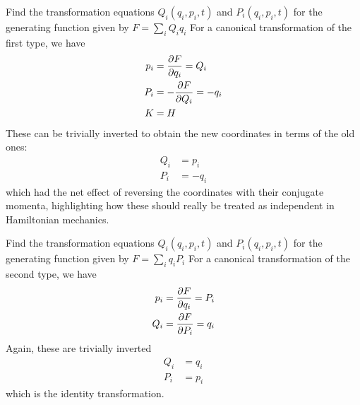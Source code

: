\begin{example}{0pt}{Find the transformation equations $Q_i(q_i,p_i,t)$ and $P_i(q_i,p_i,t)$ for the generating function given by $F=\sum_iQ_iq_i$}{}
For a canonical transformation of the first type, we have
\begin{align*}
p_i&=\frac{\partial F}{\partial q_i}=Q_i\nonumber\\
P_i&=-\frac{\partial F}{\partial Q_i}=-q_i\nonumber\\
K&=H
\end{align*}
These can be trivially inverted to obtain the new coordinates in terms of the old ones:
\begin{align*}
Q_i&=p_i\nonumber\\
P_i&=-q_i
\end{align*}
which had the net effect of reversing the coordinates with their conjugate momenta, highlighting how these should really be treated as independent in Hamiltonian mechanics.
\end{example}
\begin{example}{0pt}{Find the transformation equations $Q_i(q_i,p_i,t)$ and $P_i(q_i,p_i,t)$ for the generating function given by $F=\sum_iq_iP_i$}{}
For a canonical transformation of the second type, we have
\begin{align*}
p_i&=\frac{\partial F}{\partial q_i}=P_i\nonumber\\
Q_i&=\frac{\partial F}{\partial P_i}=q_i
\end{align*}
Again, these are trivially inverted
\begin{align*}
Q_i&=q_i\nonumber\\
P_i&=p_i
\end{align*}
which is the identity transformation.
\end{example}

